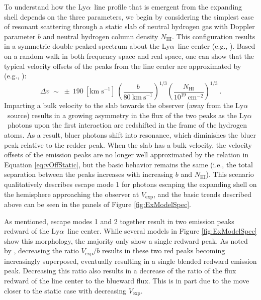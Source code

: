 \documentclass{emulateapj}
\newcommand{\lya}{Ly$\alpha$}
\def\nh{$N_{\mathrm{HI}}$}
\def\vexp{$V_{\mathrm{exp}}$}
\begin{document}
To understand how the \lya\ line profile that is emergent from the expanding shell depends on the three parameters, we begin by considering the simplest case of resonant scattering through a static slab of neutral hydrogen gas with Doppler parameter $b$ and neutral hydrogen column density \nh. This configuration results in a symmetric double-peaked spectrum about the \lya\ line center (e.g., \citealp{neufeld1990}). Based on a random walk in both frequency space and real space, one can show that the typical velocity offsets of the peaks from the line center are approximated by (e.g., \citealp{hansen2006,verhamme2008}):
\begin{equation}\label{eq:vOffStatic}
\Delta v \; \sim \; \pm \: 190 \: \left[\mathrm{km \; s}^{-1}\right] \: \left(\frac{b}{80 \: \mathrm{km \: s}^{-1}}\right)^{1/3} \left(\frac{N_{\mathrm{HI}}}{10^{19} \: \mathrm{cm}^{-2}}\right)^{1/3} \: .
\end{equation}
Imparting a bulk velocity to the slab towards the observer (away from the \lya\ source) results in a growing asymmetry in the flux of the two peaks as the \lya\ photons upon the first interaction are redshifted in the frame of the hydrogen atoms. As a result, bluer photons shift into resonance, which diminishes the bluer peak relative to the redder peak. When the slab has a bulk velocity, the velocity offsets of the emission peaks are no longer well approximated by the relation in Equation \ref{eq:vOffStatic}, but the basic behavior remains the same (i.e., the total separation between the peaks increases with increasing $b$ and \nh). This scenario qualitatively describes escape mode 1 for photons escaping the expanding shell on the hemisphere approaching the observer at \vexp, and the basic trends described above can be seen in the panels of Figure \ref{fig:ExModelSpec}. 

As mentioned, escape modes 1 and 2 together result in two emission peaks redward of the \lya\ line center. While several models in Figure \ref{fig:ExModelSpec} show this morphology, the majority only show a single redward peak. As noted by \citet{verhamme2006}, decreasing the ratio $V_{\mathrm{exp}} / b$ results in these two red peaks becoming increasingly superposed, eventually resulting in a single blended redward emission peak. Decreasing this ratio also results in a decrease of the ratio of the flux redward of the line center to the blueward flux. This is in part due to the move closer to the static case with decreasing \vexp. 
\end{document}
